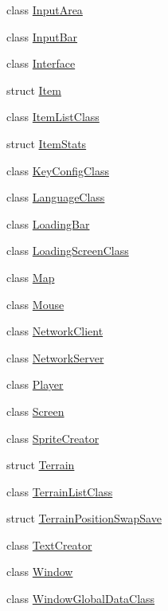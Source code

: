 \begin{DoxyCompactItemize}
\item 
class \mbox{\hyperlink{classtfp_1_1_input_area}{Input\+Area}}
\item 
class \mbox{\hyperlink{classtfp_1_1_input_bar}{Input\+Bar}}
\item 
class \mbox{\hyperlink{classtfp_1_1_interface}{Interface}}
\item 
struct \mbox{\hyperlink{structtfp_1_1_item}{Item}}
\item 
class \mbox{\hyperlink{classtfp_1_1_item_list_class}{Item\+List\+Class}}
\item 
struct \mbox{\hyperlink{structtfp_1_1_item_stats}{Item\+Stats}}
\item 
class \mbox{\hyperlink{classtfp_1_1_key_config_class}{Key\+Config\+Class}}
\item 
class \mbox{\hyperlink{classtfp_1_1_language_class}{Language\+Class}}
\item 
class \mbox{\hyperlink{classtfp_1_1_loading_bar}{Loading\+Bar}}
\item 
class \mbox{\hyperlink{classtfp_1_1_loading_screen_class}{Loading\+Screen\+Class}}
\item 
class \mbox{\hyperlink{classtfp_1_1_map}{Map}}
\item 
class \mbox{\hyperlink{classtfp_1_1_mouse}{Mouse}}
\item 
class \mbox{\hyperlink{classtfp_1_1_network_client}{Network\+Client}}
\item 
class \mbox{\hyperlink{classtfp_1_1_network_server}{Network\+Server}}
\item 
class \mbox{\hyperlink{classtfp_1_1_player}{Player}}
\item 
class \mbox{\hyperlink{classtfp_1_1_screen}{Screen}}
\item 
class \mbox{\hyperlink{classtfp_1_1_sprite_creator}{Sprite\+Creator}}
\item 
struct \mbox{\hyperlink{structtfp_1_1_terrain}{Terrain}}
\item 
class \mbox{\hyperlink{classtfp_1_1_terrain_list_class}{Terrain\+List\+Class}}
\item 
struct \mbox{\hyperlink{structtfp_1_1_terrain_position_swap_save}{Terrain\+Position\+Swap\+Save}}
\item 
class \mbox{\hyperlink{classtfp_1_1_text_creator}{Text\+Creator}}
\item 
class \mbox{\hyperlink{classtfp_1_1_window}{Window}}
\item 
class \mbox{\hyperlink{classtfp_1_1_window_global_data_class}{Window\+Global\+Data\+Class}}
\end{DoxyCompactItemize}
